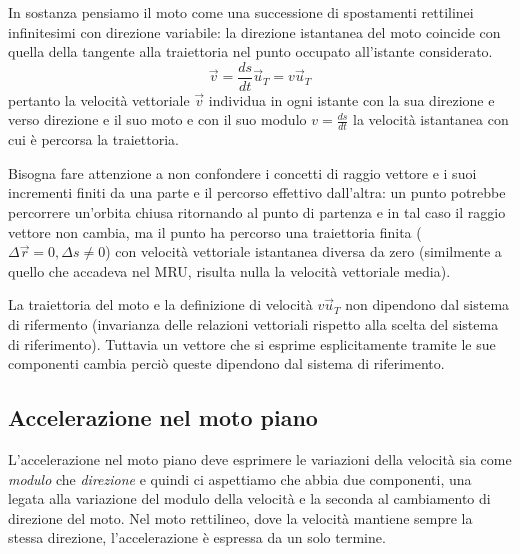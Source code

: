 \documentclass[class=book, crop=false, oneside, 12pt]{standalone}
\begin{document}
In sostanza pensiamo il moto come una successione di spostamenti rettilinei infinitesimi con direzione variabile: la direzione istantanea del moto coincide con quella della tangente alla traiettoria nel punto occupato all'istante considerato.
\begin{equation}
  \overrightarrow{v} = \frac{ds}{dt} \overrightarrow{u}_T = v \overrightarrow{u}_T
\end{equation}
pertanto la velocità vettoriale \(\overrightarrow{v}\) individua in ogni istante con la sua direzione e verso direzione e il suo moto e con il suo modulo \(v = \frac{ds}{dt}\) la velocità istantanea con cui è percorsa la traiettoria. 

Bisogna fare attenzione a non confondere i concetti di raggio vettore e i suoi incrementi finiti da una parte e il percorso effettivo dall'altra:
un punto potrebbe percorrere un'orbita chiusa ritornando al punto di partenza e in tal caso il raggio vettore non cambia, ma il punto ha percorso una traiettoria finita (\(\Delta \overrightarrow{r} = 0, \Delta s \neq 0\)) con velocità vettoriale istantanea diversa da zero (similmente a quello che accadeva nel MRU, risulta nulla la velocità vettoriale media).

La traiettoria del moto e la definizione di velocità \(v \overrightarrow{u}_T\) non dipendono dal sistema di rifermento (invarianza delle relazioni vettoriali rispetto alla scelta del sistema di riferimento).
Tuttavia un vettore che si esprime esplicitamente tramite le sue componenti cambia perciò queste dipendono dal sistema di riferimento.

\subsection{Accelerazione nel moto piano}

L'accelerazione nel moto piano deve esprimere le variazioni della velocità sia come \emph{modulo} che \emph{direzione} e quindi ci aspettiamo che abbia due componenti, 
una legata alla variazione del modulo della velocità e la seconda al cambiamento di direzione del moto. 
Nel moto rettilineo, dove la velocità mantiene sempre la stessa direzione, l'accelerazione è espressa da un solo termine. 
\end{document}
